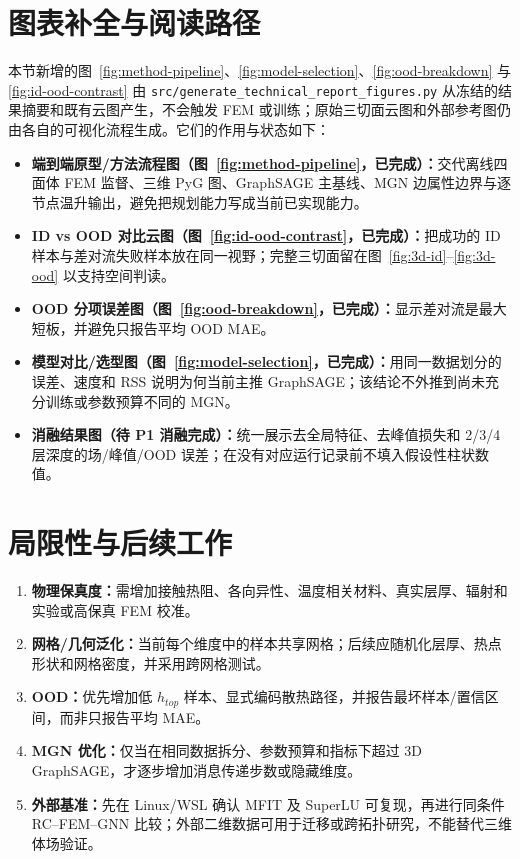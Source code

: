 \documentclass[11pt,a4paper]{article}
\newcommand{\code}[1]{\texttt{#1}}
\begin{document}
\section{图表补全与阅读路径}

本节新增的图~\ref{fig:method-pipeline}、\ref{fig:model-selection}、\ref{fig:ood-breakdown} 与 \ref{fig:id-ood-contrast} 由 \code{src/generate\_technical\_report\_figures.py} 从冻结的结果摘要和既有云图产生，不会触发 FEM 或训练；原始三切面云图和外部参考图仍由各自的可视化流程生成。它们的作用与状态如下：
\begin{itemize}[leftmargin=1.5em]
  \item \textbf{端到端原型/方法流程图（图~\ref{fig:method-pipeline}，已完成）：}交代离线四面体 FEM 监督、三维 PyG 图、GraphSAGE 主基线、MGN 边属性边界与逐节点温升输出，避免把规划能力写成当前已实现能力。
  \item \textbf{ID vs OOD 对比云图（图~\ref{fig:id-ood-contrast}，已完成）：}把成功的 ID 样本与差对流失败样本放在同一视野；完整三切面留在图~\ref{fig:3d-id}--\ref{fig:3d-ood} 以支持空间判读。
  \item \textbf{OOD 分项误差图（图~\ref{fig:ood-breakdown}，已完成）：}显示差对流是最大短板，并避免只报告平均 OOD MAE。
  \item \textbf{模型对比/选型图（图~\ref{fig:model-selection}，已完成）：}用同一数据划分的误差、速度和 RSS 说明为何当前主推 GraphSAGE；该结论不外推到尚未充分训练或参数预算不同的 MGN。
  \item \textbf{消融结果图（待 P1 消融完成）：}统一展示去全局特征、去峰值损失和 2/3/4 层深度的场/峰值/OOD 误差；在没有对应运行记录前不填入假设性柱状数值。
\end{itemize}

\section{局限性与后续工作}
\begin{enumerate}[leftmargin=1.5em]
  \item \textbf{物理保真度：}需增加接触热阻、各向异性、温度相关材料、真实层厚、辐射和实验或高保真 FEM 校准。
  \item \textbf{网格/几何泛化：}当前每个维度中的样本共享网格；后续应随机化层厚、热点形状和网格密度，并采用跨网格测试。
  \item \textbf{OOD：}优先增加低 $h_{top}$ 样本、显式编码散热路径，并报告最坏样本/置信区间，而非只报告平均 MAE。
  \item \textbf{MGN 优化：}仅当在相同数据拆分、参数预算和指标下超过 3D GraphSAGE，才逐步增加消息传递步数或隐藏维度。
  \item \textbf{外部基准：}先在 Linux/WSL 确认 MFIT 及 SuperLU 可复现，再进行同条件 RC--FEM--GNN 比较；外部二维数据可用于迁移或跨拓扑研究，不能替代三维体场验证。
\end{enumerate}
\end{document}
